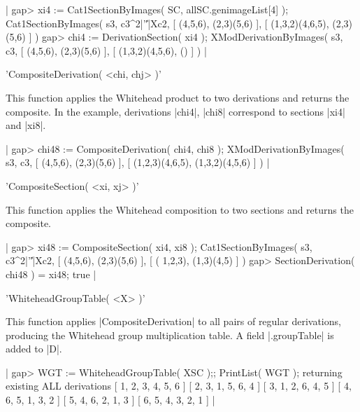 {|    gap> xi4 := Cat1SectionByImages( SC, allSC.genimageList[4] );
    Cat1SectionByImages( s3, c3^2|'\|'|Xc2, [ (4,5,6), (2,3)(5,6) ], 
       [ (1,3,2)(4,6,5), (2,3)(5,6) ] )
    gap> chi4 := DerivationSection( xi4 );
    XModDerivationByImages( s3, c3, [ (4,5,6), (2,3)(5,6) ],
       [ (1,3,2)(4,5,6), () ] )  |

%

'CompositeDerivation( <chi, chj> )'

This function applies the Whitehead product to two derivations
and returns the composite.
In the example, derivations |chi4|, |chi8| correspond to
sections |xi4| and |xi8|.

|    gap> chi48 := CompositeDerivation( chi4, chi8 );
    XModDerivationByImages( s3, c3, [ (4,5,6), (2,3)(5,6) ], 
       [ (1,2,3)(4,6,5), (1,3,2)(4,5,6) ] )  |

%

'CompositeSection( <xi, xj> )'

This function applies the Whitehead composition to two sections
and returns the composite.

|    gap> xi48 := CompositeSection( xi4, xi8 );
    Cat1SectionByImages( s3, c3^2|'\|'|Xc2, [ (4,5,6), (2,3)(5,6) ], 
       [ ( 1,2,3), (1,3)(4,5) ] )
    gap> SectionDerivation( chi48 ) = xi48;
    true  |

%

'WhiteheadGroupTable( <X> )'

This function applies |CompositeDerivation| to all pairs of 
regular derivations, producing the Whitehead group multiplication table. 
A field |.groupTable| is added to |D|.

|    gap> WGT := WhiteheadGroupTable( XSC );; PrintList( WGT );
    returning existing ALL derivations
    [ 1, 2, 3, 4, 5, 6 ]
    [ 2, 3, 1, 5, 6, 4 ]
    [ 3, 1, 2, 6, 4, 5 ]
    [ 4, 6, 5, 1, 3, 2 ]
    [ 5, 4, 6, 2, 1, 3 ]
    [ 6, 5, 4, 3, 2, 1 ]  |

%

}
